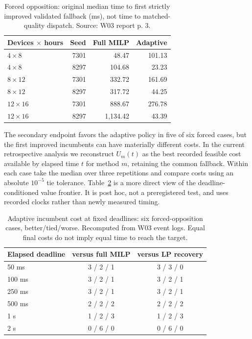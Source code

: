 \documentclass[11pt,letterpaper]{article}
\begin{document}
\begin{table}[htbp]\centering\small
\caption{Forced opposition: original median time to first strictly improved validated fallback (ms), not time to matched-quality dispatch. Source: W03 report p. 3.}\label{tab:w03first}
\begin{tabular}{lrrr}\toprule
Devices $\times$ hours & Seed & Full MILP & Adaptive\\\midrule
$4\times8$ &7301&48.47&101.13\\
$4\times8$ &8297&104.68&23.23\\
$8\times12$ &7301&332.72&161.69\\
$8\times12$ &8297&317.72&44.25\\
$12\times16$ &7301&888.67&276.78\\
$12\times16$ &8297&1,134.42&43.39\\\bottomrule\end{tabular}
\end{table}

The secondary endpoint favors the adaptive policy in five of six forced cases, but the first improved incumbents can have materially different costs. In the current retrospective analysis we reconstruct $U_m(t)$ as the best recorded feasible cost available by elapsed time $t$ for method $m$, retaining the common fallback. Within each case take the median over three repetitions and compare costs using an absolute $10^{-5}$ tie tolerance. Table~\ref{tab:w03frontier} is a more direct view of the deadline-conditioned value frontier. It is post hoc, not a preregistered test, and uses recorded clocks rather than newly measured timing.

\begin{table}[htbp]\centering\small
\caption{Adaptive incumbent cost at fixed deadlines: six forced-opposition cases, better/tied/worse. Recomputed from W03 event logs. Equal final costs do not imply equal time to reach the target.}\label{tab:w03frontier}
\begin{tabular}{lcc}\toprule
Elapsed deadline & versus full MILP & versus LP recovery\\\midrule
50 ms &3 / 2 / 1&3 / 3 / 0\\
100 ms &3 / 2 / 1&3 / 2 / 1\\
250 ms &3 / 2 / 1&3 / 2 / 1\\
500 ms &2 / 2 / 2&2 / 2 / 2\\
1 s &1 / 2 / 3&1 / 2 / 3\\
2 s &0 / 6 / 0&0 / 6 / 0\\\bottomrule\end{tabular}
\end{table}
\end{document}
